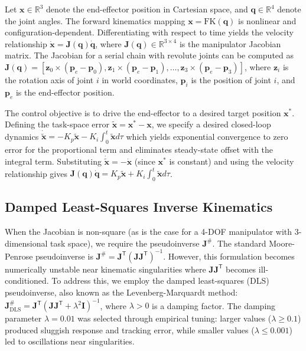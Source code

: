 \documentclass[12pt,a4paper,oneside]{report}
\begin{document}
Let $\mathbf{x} \in \mathbb{R}^3$ denote the end-effector position in Cartesian space, and $\mathbf{q} \in \mathbb{R}^4$ denote the joint angles. The forward kinematics mapping $\mathbf{x} = \text{FK}(\mathbf{q})$ is nonlinear and configuration-dependent. Differentiating with respect to time yields the velocity relationship $\dot{\mathbf{x}} = \mathbf{J}(\mathbf{q}) \dot{\mathbf{q}}$, where $\mathbf{J}(\mathbf{q}) \in \mathbb{R}^{3 \times 4}$ is the manipulator Jacobian matrix. The Jacobian for a serial chain with revolute joints can be computed as $\mathbf{J}(\mathbf{q}) = [\mathbf{z}_0 \times (\mathbf{p}_e - \mathbf{p}_0), \mathbf{z}_1 \times (\mathbf{p}_e - \mathbf{p}_1), \ldots, \mathbf{z}_3 \times (\mathbf{p}_e - \mathbf{p}_3)]$, where $\mathbf{z}_i$ is the rotation axis of joint $i$ in world coordinates, $\mathbf{p}_i$ is the position of joint $i$, and $\mathbf{p}_e$ is the end-effector position.

The control objective is to drive the end-effector to a desired target position $\mathbf{x}^*$. Defining the task-space error $\tilde{\mathbf{x}} = \mathbf{x}^* - \mathbf{x}$, we specify a desired closed-loop dynamics $\dot{\tilde{\mathbf{x}}} = -K_p \tilde{\mathbf{x}} - K_i \int_0^t \tilde{\mathbf{x}} d\tau$ which yields exponential convergence to zero error for the proportional term and eliminates steady-state offset with the integral term. Substituting $\dot{\tilde{\mathbf{x}}} = -\dot{\mathbf{x}}$ (since $\mathbf{x}^*$ is constant) and using the velocity relationship gives $\mathbf{J}(\mathbf{q}) \dot{\mathbf{q}} = K_p \tilde{\mathbf{x}} + K_i \int_0^t \tilde{\mathbf{x}} d\tau$.

\subsection{Damped Least-Squares Inverse Kinematics}
\label{subsec:damped_least_squares_inverse_kinematics}

When the Jacobian is non-square (as is the case for a 4-DOF manipulator with 3-dimensional task space), we require the pseudoinverse $\mathbf{J}^{\#}$. The standard Moore-Penrose pseudoinverse is $\mathbf{J}^{\#} = \mathbf{J}^{\mathsf{T}} (\mathbf{J} \mathbf{J}^{\mathsf{T}})^{-1}$. However, this formulation becomes numerically unstable near kinematic singularities where $\mathbf{J} \mathbf{J}^{\mathsf{T}}$ becomes ill-conditioned. To address this, we employ the damped least-squares (DLS) pseudoinverse, also known as the Levenberg-Marquardt method: $\mathbf{J}^{\#}_{\text{DLS}} = \mathbf{J}^{\mathsf{T}} (\mathbf{J} \mathbf{J}^{\mathsf{T}} + \lambda^2 \mathbf{I})^{-1}$, where $\lambda > 0$ is a damping factor. The damping parameter $\lambda = 0.01$ was selected through empirical tuning: larger values ($\lambda \geq 0.1$) produced sluggish response and tracking error, while smaller values ($\lambda \leq 0.001$) led to oscillations near singularities.
\end{document}
